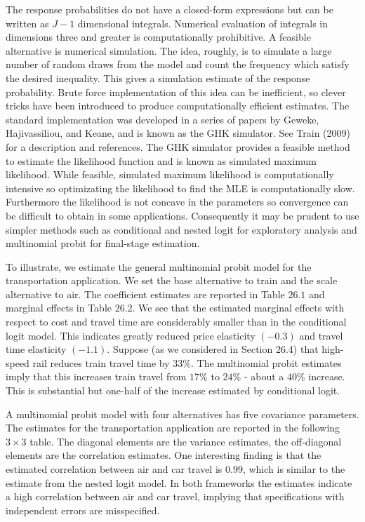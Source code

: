 \documentclass[10pt]{article}
\begin{document}
The response probabilities do not have a closed-form expressions but can be written as $J-1$ dimensional integrals. Numerical evaluation of integrals in dimensions three and greater is computationally prohibitive. A feasible alternative is numerical simulation. The idea, roughly, is to simulate a large number of random draws from the model and count the frequency which satisfy the desired inequality. This gives a simulation estimate of the response probability. Brute force implementation of this idea can be inefficient, so clever tricks have been introduced to produce computationally efficient estimates. The standard implementation was developed in a series of papers by Geweke, Hajivassiliou, and Keane, and is known as the GHK simulator. See Train (2009) for a description and references. The GHK simulator provides a feasible method to estimate the likelihood function and is known as simulated maximum likelihood. While feasible, simulated maximum likelihood is computationally intensive so optimizating the likelihood to find the MLE is computationally slow. Furthermore the likelihood is not concave in the parameters so convergence can be difficult to obtain in some applications. Consequently it may be prudent to use simpler methods such as conditional and nested logit for exploratory analysis and multinomial probit for final-stage estimation.

To illustrate, we estimate the general multinomial probit model for the transportation application. We set the base alternative to train and the scale alternative to air. The coefficient estimates are reported in Table $26.1$ and marginal effects in Table $26.2$. We see that the estimated marginal effects with respect to cost and travel time are considerably smaller than in the conditional logit model. This indicates greatly reduced price elasticity $(-0.3)$ and travel time elasticity $(-1.1)$. Suppose (as we considered in Section 26.4) that high-speed rail reduces train travel time by $33 \%$. The multinomial probit estimates imply that this increases train travel from $17 \%$ to $24 \%$ - about a $40 \%$ increase. This is substantial but one-half of the increase estimated by conditional logit.

A multinomial probit model with four alternatives has five covariance parameters. The estimates for the transportation application are reported in the following $3 \times 3$ table. The diagonal elements are the variance estimates, the off-diagonal elements are the correlation estimates. One interesting finding is that the estimated correlation between air and car travel is $0.99$, which is similar to the estimate from the nested logit model. In both frameworks the estimates indicate a high correlation between air and car travel, implying that specifications with independent errors are misspecified.
\end{document}
